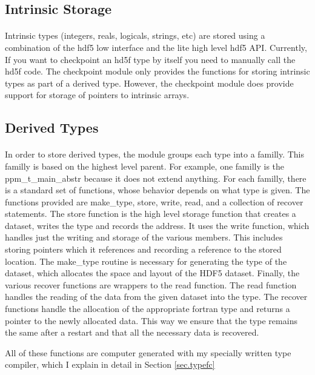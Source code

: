 \documentclass{article}
\begin{document}
\subsection{Intrinsic Storage}
\paragraph{}
Intrinsic types (integers, reals, logicals, strings, etc) are stored using a combination of the hdf5 low interface and the lite high level hdf5 API. Currently, If you want to checkpoint an hd5f type by itself you need to manually call the hd5f code. The checkpoint module only provides the functions for storing intrinsic types as part of a derived type. However, the checkpoint module does provide support for storage of pointers to intrinsic arrays.
\subsection{Derived Types}
\paragraph{}
In order to store derived types, the module groups each type into a familly. This familly is based on the highest level parent. For example, one familly is the ppm\_t\_main\_abstr because it does not extend anything. For each familly, there is a standard set of functions, whose behavior depends on what type is given. The functions provided are make\_type, store, write, read, and a collection of recover statements. The store function is the high level storage function that creates a dataset, writes the type and records the address. It uses the write function, which handles just the writing and storage of the various members. This includes storing pointers which it references and recording a reference to the stored location. The make\_type routine is necessary for generating the type of the dataset, which allocates the space and layout of the HDF5 dataset. Finally, the various recover functions are wrappers to the read function. The read function handles the reading of the data from the given dataset into the type. The recover functions handle the allocation of the appropriate fortran type and returns a pointer to the newly allocated data. This way we ensure that the type remains the same after a restart and that all the necessary data is recovered.

All of these functions are computer generated with my specially written type compiler, which I explain in detail in Section \ref{sec.typefc}
\end{document}

